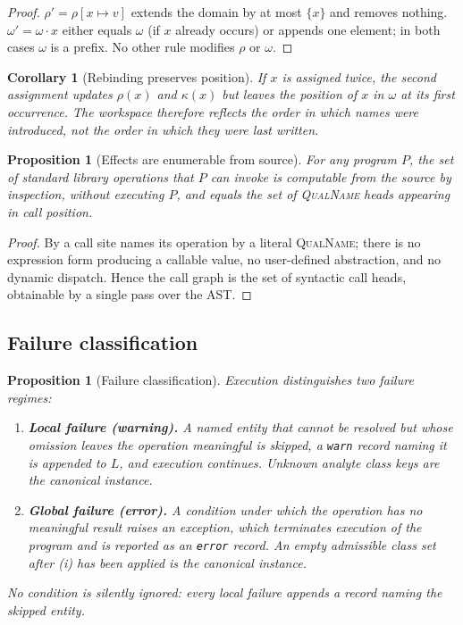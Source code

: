 \documentclass[11pt,twocolumn,a4paper]{article}
\theoremstyle{ssthm}
\newtheorem{proposition}[theorem]{Proposition}
\newtheorem{corollary}[theorem]{Corollary}
\theoremstyle{definition}
\theoremstyle{remark}
\newcommand{\shk}[1]{\texttt{#1}}
\newcommand{\Env}{\rho}
\newcommand{\Kinds}{\kappa}
\newcommand{\Ord}{\omega}
\newcommand{\Prog}{P}
\begin{document}
\begin{proof}
$\Env'=\Env[x\mapsto v]$ extends the domain by at most $\{x\}$ and
removes nothing. $\Ord'=\Ord\cdot x$ either equals $\Ord$ (if $x$ already
occurs) or appends one element; in both cases $\Ord$ is a prefix. No
other rule modifies $\Env$ or $\Ord$.
\end{proof}

\begin{corollary}[Rebinding preserves position]
\label{cor:rebind}
If $x$ is assigned twice, the second assignment updates $\Env(x)$ and
$\Kinds(x)$ but leaves the position of $x$ in $\Ord$ at its first
occurrence. The workspace therefore reflects the order in which names
were \emph{introduced}, not the order in which they were last written.
\end{corollary}

\begin{proposition}[Effects are enumerable from source]
\label{prop:enumerable}
For any program $\Prog$, the set of standard library operations that
$\Prog$ can invoke is computable from the source by inspection, without
executing $\Prog$, and equals the set of \textsc{QualName} heads
appearing in call position.
\end{proposition}

\begin{proof}
By  a call site names its operation by a literal
\textsc{QualName}; there is no expression form producing a callable
value, no user-defined abstraction, and no dynamic dispatch. Hence the
call graph is the set of syntactic call heads, obtainable by a single
pass over the AST.
\end{proof}

\subsection{Failure classification}

\begin{proposition}[Failure classification]
\label{prop:failure-classification}
Execution distinguishes two failure regimes:
\begin{enumerate}[label=\textup{(\roman*)},leftmargin=2.2em,itemsep=2pt]
\item \textbf{Local failure (warning).} A named entity that cannot be
      resolved but whose omission leaves the operation meaningful is
      skipped, a \shk{warn} record naming it is appended to $L$, and
      execution continues. Unknown analyte class keys are the canonical
      instance.
\item \textbf{Global failure (error).} A condition under which the
      operation has no meaningful result raises an exception, which
      terminates execution of the program and is reported as an
      \shk{error} record. An empty admissible class set after (i) has been
      applied is the canonical instance.
\end{enumerate}
No condition is silently ignored: every local failure appends a record
naming the skipped entity.
\end{proposition}
\end{document}
